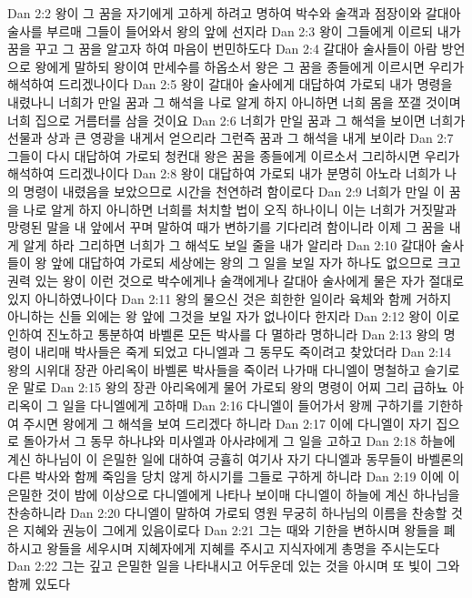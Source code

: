 Dan 2:2  왕이 그 꿈을 자기에게 고하게 하려고 명하여 박수와 술객과 점장이와 갈대아 술사를 부르매 그들이 들어와서 왕의 앞에 선지라
Dan 2:3  왕이 그들에게 이르되 내가 꿈을 꾸고 그 꿈을 알고자 하여 마음이 번민하도다
Dan 2:4  갈대아 술사들이 아람 방언으로 왕에게 말하되 왕이여 만세수를 하옵소서 왕은 그 꿈을 종들에게 이르시면 우리가 해석하여 드리겠나이다
Dan 2:5  왕이 갈대아 술사에게 대답하여 가로되 내가 명령을 내렸나니 너희가 만일 꿈과 그 해석을 나로 알게 하지 아니하면 너희 몸을 쪼갤 것이며 너희 집으로 거름터를 삼을 것이요
Dan 2:6  너희가 만일 꿈과 그 해석을 보이면 너희가 선물과 상과 큰 영광을 내게서 얻으리라 그런즉 꿈과 그 해석을 내게 보이라
Dan 2:7  그들이 다시 대답하여 가로되 청컨대 왕은 꿈을 종들에게 이르소서 그리하시면 우리가 해석하여 드리겠나이다
Dan 2:8  왕이 대답하여 가로되 내가 분명히 아노라 너희가 나의 명령이 내렸음을 보았으므로 시간을 천연하려 함이로다
Dan 2:9  너희가 만일 이 꿈을 나로 알게 하지 아니하면 너희를 처치할 법이 오직 하나이니 이는 너희가 거짓말과 망령된 말을 내 앞에서 꾸며 말하여 때가 변하기를 기다리려 함이니라 이제 그 꿈을 내게 알게 하라 그리하면 너희가 그 해석도 보일 줄을 내가 알리라
Dan 2:10  갈대아 술사들이 왕 앞에 대답하여 가로되 세상에는 왕의 그 일을 보일 자가 하나도 없으므로 크고 권력 있는 왕이 이런 것으로 박수에게나 술객에게나 갈대아 술사에게 물은 자가 절대로 있지 아니하였나이다
Dan 2:11  왕의 물으신 것은 희한한 일이라 육체와 함께 거하지 아니하는 신들 외에는 왕 앞에 그것을 보일 자가 없나이다 한지라
Dan 2:12  왕이 이로 인하여 진노하고 통분하여 바벨론 모든 박사를 다 멸하라 명하니라
Dan 2:13  왕의 명령이 내리매 박사들은 죽게 되었고 다니엘과 그 동무도 죽이려고 찾았더라
Dan 2:14  왕의 시위대 장관 아리옥이 바벨론 박사들을 죽이러 나가매 다니엘이 명철하고 슬기로운 말로
Dan 2:15  왕의 장관 아리옥에게 물어 가로되 왕의 명령이 어찌 그리 급하뇨 아리옥이 그 일을 다니엘에게 고하매
Dan 2:16  다니엘이 들어가서 왕께 구하기를 기한하여 주시면 왕에게 그 해석을 보여 드리겠다 하니라
Dan 2:17  이에 다니엘이 자기 집으로 돌아가서 그 동무 하나냐와 미사엘과 아사랴에게 그 일을 고하고
Dan 2:18  하늘에 계신 하나님이 이 은밀한 일에 대하여 긍휼히 여기사 자기 다니엘과 동무들이 바벨론의 다른 박사와 함께 죽임을 당치 않게 하시기를 그들로 구하게 하니라
Dan 2:19  이에 이 은밀한 것이 밤에 이상으로 다니엘에게 나타나 보이매 다니엘이 하늘에 계신 하나님을 찬송하니라
Dan 2:20  다니엘이 말하여 가로되 영원 무궁히 하나님의 이름을 찬송할 것은 지혜와 권능이 그에게 있음이로다
Dan 2:21  그는 때와 기한을 변하시며 왕들을 폐하시고 왕들을 세우시며 지혜자에게 지혜를 주시고 지식자에게 총명을 주시는도다
Dan 2:22  그는 깊고 은밀한 일을 나타내시고 어두운데 있는 것을 아시며 또 빛이 그와 함께 있도다
